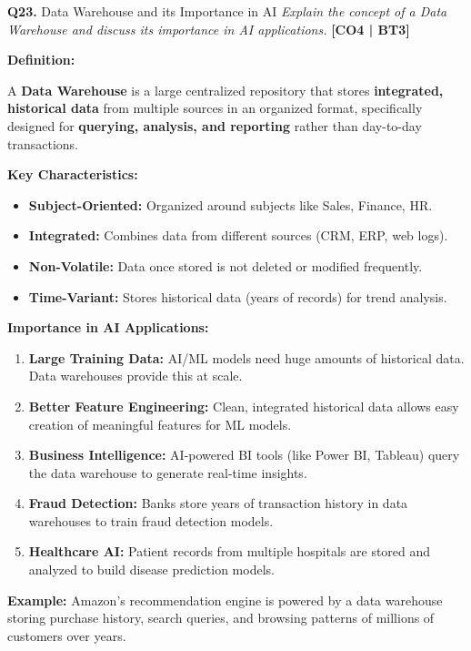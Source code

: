 \documentclass[12pt,a4paper]{article}
\newcommand{\Qno}[1]{\textbf{\color{darkred}Q#1.}}
\newcommand{\term}[1]{\textbf{\color{headingcolor}#1}}
\begin{document}
\vspace{8pt}

\begin{questionbox}{\Qno{23} Data Warehouse and its Importance in AI}
\textit{Explain the concept of a Data Warehouse and discuss its importance in AI applications.} \hfill \textbf{[CO4 | BT3]}
\end{questionbox}

\begin{answerenv}

\textbf{\color{headingcolor}Definition:}

A \textbf{Data Warehouse} is a large centralized repository that stores \textbf{integrated, historical data} from multiple sources in an organized format, specifically designed for \textbf{querying, analysis, and reporting} rather than day-to-day transactions.

\vspace{6pt}
\textbf{\color{headingcolor}Key Characteristics:}
\begin{itemize}[leftmargin=1.5em, itemsep=2pt]
  \item \term{Subject-Oriented:} Organized around subjects like Sales, Finance, HR.
  \item \term{Integrated:} Combines data from different sources (CRM, ERP, web logs).
  \item \term{Non-Volatile:} Data once stored is not deleted or modified frequently.
  \item \term{Time-Variant:} Stores historical data (years of records) for trend analysis.
\end{itemize}

\vspace{6pt}
\textbf{\color{headingcolor}Importance in AI Applications:}
\begin{enumerate}[leftmargin=1.8em, itemsep=4pt]
  \item \term{Large Training Data:} AI/ML models need huge amounts of historical data. Data warehouses provide this at scale.
  \item \term{Better Feature Engineering:} Clean, integrated historical data allows easy creation of meaningful features for ML models.
  \item \term{Business Intelligence:} AI-powered BI tools (like Power BI, Tableau) query the data warehouse to generate real-time insights.
  \item \term{Fraud Detection:} Banks store years of transaction history in data warehouses to train fraud detection models.
  \item \term{Healthcare AI:} Patient records from multiple hospitals are stored and analyzed to build disease prediction models.
\end{enumerate}

\begin{keypoint}
\textbf{Example:} Amazon's recommendation engine is powered by a data warehouse storing purchase history, search queries, and browsing patterns of millions of customers over years.
\end{keypoint}

\end{answerenv}
\end{document}
